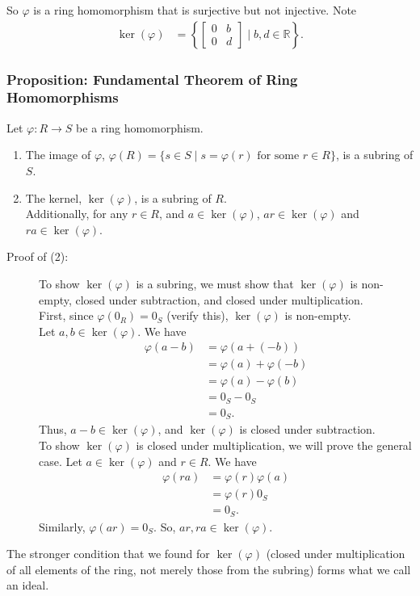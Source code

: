 \documentclass[8pt]{extarticle}
\newcommand{\R}{\mathbb{R}}
\begin{document}
  So $\varphi$ is a ring homomorphism that is surjective but not injective. Note
  \begin{align*}
    \ker(\varphi) &= \left\{ \begin{bmatrix}0&b\\0&d\end{bmatrix}\mid b,d\in\R\right\}.
  \end{align*}
  \subsubsection{Proposition: Fundamental Theorem of Ring Homomorphisms}%
  Let $\varphi: R\rightarrow S$ be a ring homomorphism.
  \begin{enumerate}[(1)]
    \item The image of $\varphi$, $\varphi(R) = \{s\in S\mid s = \varphi(r)\text{ for some }r\in R\}$, is a subring of $S$.
    \item The kernel, $\ker(\varphi)$, is a subring of $R$.\\

      Additionally, for any $r\in R$, and $a\in \ker(\varphi)$, $ar\in \ker(\varphi)$ and $ra\in \ker(\varphi)$.
  \end{enumerate}
  \begin{description}
    \item[Proof of (2):] To show $\ker(\varphi)$ is a subring, we must show that $\ker(\varphi)$ is non-empty, closed under subtraction, and closed under multiplication.\\

      First, since $\varphi(0_R) = 0_S$ (verify this), $\ker(\varphi)$ is non-empty.\\

      Let $a,b\in\ker(\varphi)$. We have
      \begin{align*}
        \varphi(a-b) &= \varphi(a + (-b))\\
                     &= \varphi(a) + \varphi(-b)\\
                     &= \varphi(a)-\varphi(b) \tag*{check $\varphi(-b) = -\varphi(b)$}\\
                     &= 0_S - 0_S\\
                     &= 0_S.
      \end{align*}
      Thus, $a-b\in\ker(\varphi)$, and $\ker(\varphi)$ is closed under subtraction.\\

      To show $\ker(\varphi)$ is closed under multiplication, we will prove the general case. Let $a\in\ker(\varphi)$ and $r\in R$. We have
      \begin{align*}
        \varphi(ra) &= \varphi(r)\varphi(a)\\
                    &= \varphi(r)0_S\\
                    &= 0_S.
      \end{align*}
      Similarly, $\varphi(ar) = 0_S$. So, $ar,ra\in\ker(\varphi)$.
  \end{description}
  The stronger condition that we found for $\ker(\varphi)$ (closed under multiplication of all elements of the ring, not merely those from the subring) forms what we call an ideal.
\end{document}
